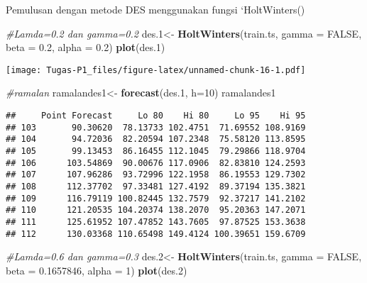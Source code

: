 \documentclass[
]{article}
\newenvironment{Shaded}{\begin{snugshade}}{\end{snugshade}}
\newcommand{\AttributeTok}[1]{\textcolor[rgb]{0.13,0.29,0.53}{#1}}
\newcommand{\CommentTok}[1]{\textcolor[rgb]{0.56,0.35,0.01}{\textit{#1}}}
\newcommand{\ConstantTok}[1]{\textcolor[rgb]{0.56,0.35,0.01}{#1}}
\newcommand{\DecValTok}[1]{\textcolor[rgb]{0.00,0.00,0.81}{#1}}
\newcommand{\FloatTok}[1]{\textcolor[rgb]{0.00,0.00,0.81}{#1}}
\newcommand{\FunctionTok}[1]{\textcolor[rgb]{0.13,0.29,0.53}{\textbf{#1}}}
\newcommand{\NormalTok}[1]{#1}
\newcommand{\OtherTok}[1]{\textcolor[rgb]{0.56,0.35,0.01}{#1}}
\begin{document}
Pemulusan dengan metode DES menggunakan fungsi `HoltWinters()

\begin{Shaded}
\begin{Highlighting}[]
\CommentTok{\#Lamda=0.2 dan gamma=0.2}
\NormalTok{des}\FloatTok{.1}\OtherTok{\textless{}{-}} \FunctionTok{HoltWinters}\NormalTok{(train.ts, }\AttributeTok{gamma =} \ConstantTok{FALSE}\NormalTok{, }\AttributeTok{beta =} \FloatTok{0.2}\NormalTok{, }\AttributeTok{alpha =} \FloatTok{0.2}\NormalTok{)}
\FunctionTok{plot}\NormalTok{(des}\FloatTok{.1}\NormalTok{)}
\end{Highlighting}
\end{Shaded}

\texttt{[image: Tugas-P1\_files/figure-latex/unnamed-chunk-16-1.pdf]}

\begin{Shaded}
\begin{Highlighting}[]
\CommentTok{\#ramalan}
\NormalTok{ramalandes1}\OtherTok{\textless{}{-}} \FunctionTok{forecast}\NormalTok{(des}\FloatTok{.1}\NormalTok{, }\AttributeTok{h=}\DecValTok{10}\NormalTok{)}
\NormalTok{ramalandes1}
\end{Highlighting}
\end{Shaded}

\begin{verbatim}
##     Point Forecast     Lo 80    Hi 80     Lo 95    Hi 95
## 103       90.30620  78.13733 102.4751  71.69552 108.9169
## 104       94.72036  82.20594 107.2348  75.58120 113.8595
## 105       99.13453  86.16455 112.1045  79.29866 118.9704
## 106      103.54869  90.00676 117.0906  82.83810 124.2593
## 107      107.96286  93.72996 122.1958  86.19553 129.7302
## 108      112.37702  97.33481 127.4192  89.37194 135.3821
## 109      116.79119 100.82445 132.7579  92.37217 141.2102
## 110      121.20535 104.20374 138.2070  95.20363 147.2071
## 111      125.61952 107.47852 143.7605  97.87525 153.3638
## 112      130.03368 110.65498 149.4124 100.39651 159.6709
\end{verbatim}

\begin{Shaded}
\begin{Highlighting}[]
\CommentTok{\#Lamda=0.6 dan gamma=0.3}
\NormalTok{des}\FloatTok{.2}\OtherTok{\textless{}{-}} \FunctionTok{HoltWinters}\NormalTok{(train.ts, }\AttributeTok{gamma =} \ConstantTok{FALSE}\NormalTok{, }\AttributeTok{beta =} \FloatTok{0.1657846}\NormalTok{, }\AttributeTok{alpha =} \DecValTok{1}\NormalTok{)}
\FunctionTok{plot}\NormalTok{(des}\FloatTok{.2}\NormalTok{)}
\end{Highlighting}
\end{Shaded}
\end{document}
